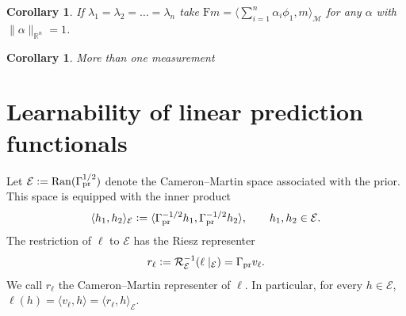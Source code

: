 \documentclass[ba]{imsart}
\theoremstyle{plain}
\newtheorem{corollary}[theorem]{Corollary}
\newcommand{\defeq}{\vcentcolon=}
\newcommand{\prcov}{\Gamma_{\mathrm{pr}}}
\newcommand{\F}{\mathrm{F}}
\newcommand{\ip}[2]{\langle {#1}, {#2}\rangle}
\newcommand{\M}{\mathcal{M}}
\newcommand{\RR}{\mathcal{R}}
\newcommand{\CM}{\mathcal{E}}
\begin{document}
\begin{corollary}
If $\lambda_1=\lambda_2=\dots=\lambda_n$ take $\F m=\langle \sum_{i=1}^n\alpha_i\phi_1,m\rangle_\M$ for any $\alpha$ with $\|\alpha\|_{\mathbb{R}^n}=1$.
\end{corollary}

\begin{corollary}
More than one measurement
\end{corollary}


\section{Learnability of linear prediction functionals}
Let $\CM \defeq \operatorname{Ran}(\prcov^{1/2})$
denote the Cameron--Martin space associated with the prior. 
This space is equipped with the
inner product
\[
    \ip{h_1}{h_2}_{\CM}
    \defeq
    \ip{\prcov^{-1/2}h_1}{\prcov^{-1/2}h_2},
    \qquad h_1,h_2\in\CM.
\]
The restriction of $\ell$ to $\CM$ has the Riesz representer
\begin{equation}\label{equ:CMrep}
    r_\ell \defeq \RR^{-1}_\CM (\ell\mid_\CM) = \prcov v_\ell.
\end{equation}
We call $r_\ell$ the Cameron--Martin representer of $\ell$.
In particular, for every $h\in\CM$,
$\ell(h)=\ip{v_\ell}{h}=\ip{r_\ell}{h}_{\CM}$.
\end{document}
